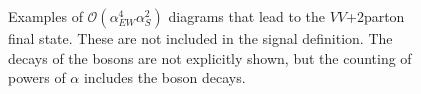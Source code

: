 %
\begin{figure}[tbp]
\begin{center}
\caption{
Examples of $\mathcal{O}(\alpha_{EW}^4 \alpha_{S}^2)$ diagrams that lead to the $VV$+2parton final state. These
are not included in the signal definition.  The decays of the bosons are not
explicitly shown, but the counting of powers of $\alpha$ includes the boson decays.
}
\label{fig:feynmanQCD}
\end{center}
\end{figure}
